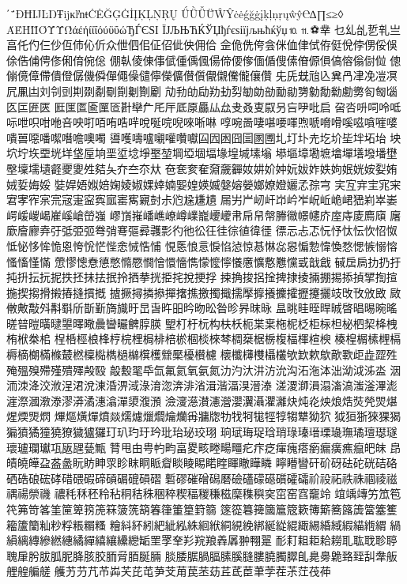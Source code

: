 ΄΅ĐĦĲĿŊŦĳĸŀŉŧĊĖĞĢĠİĮĶĻŅŖŲ
ǗǛǙǕŴŶċėǵğġįķļņŗųŵŷ℮∆∏≤≥◊
ΆΈΉΊΪΌΎΫΏάέήίϊΐόύϋΰώЂЃЄЅІ
ЇЈЉЊЋЌЎЏђѓєѕіїјљњћќўџ⒑⒒⚽丵
乜乣乨乴乵亗亯仛仢仨仯仾伂伈伒众伳伵佀佂佋佌佒佣佮
佱佹侁侉侌侎侐侓侙侟侹侻侼侽俀俁俆俈俌俜俢俰俼倇倊
倗倝倰倲倳倵偅偊偑偒偙偠偧偭偱傁傃傄傆傊傐傛傟傠傡
傯傰傹傽僀僓僜僝僟僢僤僶僺儙儜儝儣儧儨儬儭儯儱儴儹
兂兏兓兘兦兾冎冿凂凒凕凥凲凷刘刢剅剘剟劀劅劕劖劗劚
劥劧劰劶劷劸劽勄勆勏勔勜勥勨勪勬勴勶匌匓匘匛匞匥匧
匨匩匫匬匰匼卙卛厃厇厈厎厡厵厸厽叏叒叓叞叧吂吚吡启
呄呇呏呞呤呧呩呭呮咁咃咅咉咑咟哊哠哶哾唌唍唲唻唽啉
啍啘啚啛啿喓喗喣嗁嗋嗗嗘嗞嗿嘊嘙嘳嘼噁噃噄噆噡噢噣
噵嚄嚋嚧嚫嚾囋囐囜囥囦囧圁圂圑圠圢圤圥圪圿坒坢坧坮
坱坹坾垁垔垙垟垡垕垧垩垽埝埩埾堃堈埡堌堛堟堭堿塐塕
塨塸墇墈墌墖墠墡墢墦壄壂壈壖壝壡夒夓夝夡夨夰夳夵夶
夿奃奒奞奫奯奲奻妌妎妕妧妭妰妷姁姄姯姲姴姷娀娎娒娞
娤娨娪娰婄婅婈婌婐婞婻媐媓媖媙媻嫆嫈嫏嫽嬁孋孞孮宆
宎宐宑宔宨宩宭宯宱宲宺宼寁寍寏寙寚寯寴尌尗尦尮尲尵
屚屴屵屻屽岇岒岝岲岴峗峮峱峲崒崣崿嵈嵕嵑嵟嵠嵢嵤嵹
嵺嵿嶊嶓嶕嶛嶟嶫巃巎巙帇帍帠幋幐幑幜幰庎庢庤庱廌廎
廜廞廥廫弆弙弤弫弬弮弰弿彄彛彠彯彴彵彸彺徍徖徝徫徰
徱忈忐忑忨忬忲忶忺怊怓怟怭恀恈恑恖恗恱恾悂悆悈悎悑
悓悘悢悥悷惂惉惊惎惏惢惥惼愂愇愌愗愢愱愵愹慅慉慬慲
慸憀憁憃憄憋憜憠憪懀懁懎懏懞懡懧懩懬懭懯戁戃戜戠戧
戫扂扄扐扔扜扽抍抎抏抳抶抷抺抾抿拎拪拲挄挋挓挩挭捊
捒捔捘捛捦捭捸掕掚掤掦掭揁揅揈揎揓揳搊搰摋摏摓摜摡
摣撅撏撛撡撣撦撨撽擉擑擩擪擵攁攈攉攊攓攦攱攺攼攽敃
敐敒敟敽斘斠斣斦斮斳旖旘旴旵旾旿昍昑昒昖昝昣昦昩昹
昷晀晆晊晘晠晵晿晹晼暚暛暜暟曂曃曌曎曔曟曫曮朇朜朠
朢朾杅杬构枎枖枙枼枽柂柅柉柜柡柦柲柶栔栙栧栯栿桊桘
桯桰桱桹桻梈梡梩梮棑棓棜棝棪棶棽椆椉椐椖椱楅楎楦楰
楱楻榍榡榸槅槈樀樃樠樤樷橪檁檆檇檛檰檱檴檾檿櫌櫕櫖
櫰櫼欂欆欇欉欨欫欶歍歒歝歫歮歰殅殗殟殠殢殣殨殬殸殹
毃毄毣氒氙氟氦氧氨氮氻汋汏汫汸沇沟沰沲泍泏泑泧泲泴
洇洏洓洚洨浟浧涒涗涷涽淠淢淥淯淴渀渄渻湒湝湢湨溍溙
溠溭溮溳溻滀滈滍滏滭滮漄漈漍漖漛漻漭潏潓潝潬澃澓澦
澰濅濨濽瀗瀯瀴瀷灄灈灕炔炖炛炴烺焅焋焭焸煁煋煗煚熌
熚熰熿燀燌燚燸爈爉爓爚爤爯牅牎牞牫牱牻牼犉犓犨狕狖
狘狟狾猍猓猲猵獖獝獞獟獠獩獹玀玎玐玓玗玪玭珆珌珓珝
珦珷珻珿琀琑琭瑧瑨瑮璏璑璚璮璱璲瓌瓐瓓瓛瓨瓪瓼甆甒
甧甩甶甹畃畇畗畟畡畻畼疅疕疜疺瘒瘣瘩瘹瘺癀癄癙皅皌
皍皟皢皣盁盋盠盶眆眒眔眕眜眮眽睂睒睖睗睰睳睴瞮瞱瞵
矃矒矕矸砎砑砝砣硄硈硌硒硞硠硡硣碏碨碬碲碽碿磇磒磖
磛磟磪磳磶磿礆礚礞礠礩礭礵祄祋祏祑祩祻祾禌禑禓禜禨
禯秏秝秠秢秥秱秸秼稇稡稧稫稯稴稵穈穕穥穾窋窑窞竉竛
竩竬竱竻笟笣笩笰笴笿筀筪箄箉箎箖箥箲箶箺箻箽篂篈篛
篴篵篹篺簂簄簆簌簙簛簥簬簴簹簺籆籕籚籣籼粆粰粻糏糔
糩紏紑紖紦紪紭絑絗絥絧絸絻綁綖緃緄緅緆緍緎縀緢緪緭
緺縜縭縳縿繎繐繘繟繥纕纝纞缿罜罦羍羏羦羪羴羼翀翈翨
耏耓耝耟耠耮耴耾聀聄聤聭肁肹胈胍胒胮胲胶胹脋脜脠脼
腅腇腒腡腷膆膎膖膢膮臅臎臫臰臱臲臵臸舏舝舨艃艎艑艖
艧艻芀芁芇芔芖芘芚芛芠苚苠苤苭茊茋茞茟茡茬茮茳茷茽

